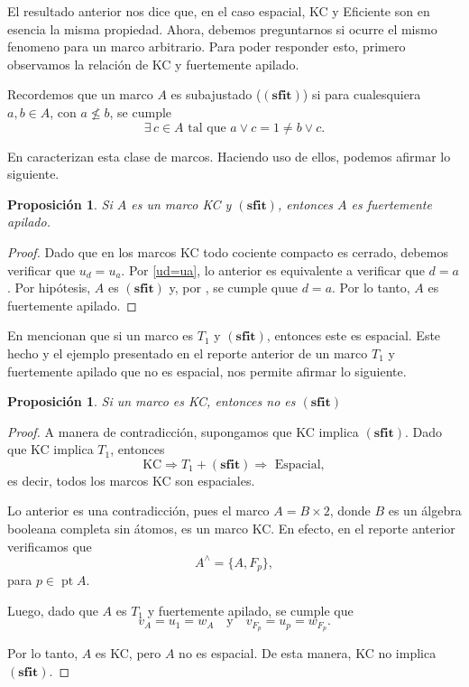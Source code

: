 \documentclass[12pt]{article}
\newtheorem{prop}[thm]{Proposición}
\DeclareMathOperator{\pt}{pt}
\begin{document}
El resultado anterior nos dice que, en el caso espacial, KC y Eficiente son en esencia la misma propiedad. Ahora, debemos
preguntarnos si ocurre el mismo fenomeno para un marco arbitrario. Para poder responder esto, primero observamos la relación
de KC y fuertemente apilado.

Recordemos que un marco $A$ es subajustado ($(\mathbf{sfit})$) si para cualesquiera $a,b\in A$, con $a\nleq b$, se cumple 
\[
\exists\, c\in A\text{ tal que }a\vee c=1\neq b\vee c.
\]

En \cite{simmons2006regularity,picado2021separation} caracterizan esta clase de marcos. Haciendo uso de ellos, 
podemos afirmar lo siguiente.

\begin{prop}\label{KCsfit}
    Si $A$ es un marco KC y $\mathbf{(sfit)}$, entonces $A$ es fuertemente apilado.
\end{prop}

\begin{proof}
    Dado que en los marcos KC todo cociente compacto es cerrado, debemos verificar que $u_d=u_a$. Por \eqref{ud=ua}, lo anterior 
    es equivalente a verificar que $d=a$. Por hipótesis, $A$ es $\mathbf{(sfit)}$ y, por \cite[Teorema 3.5]{simmons2006regularity}, 
    se cumple quue $d=a$. Por lo tanto, $A$ es fuertemente apilado.
\end{proof}

En \cite[Proposición 2.5.3]{picado2021separation} mencionan que si un marco es $T_1$ y $\mathbf{(sfit)}$, entonces este es espacial. Este hecho
y el ejemplo presentado en el reporte anterior de un marco $T_1$ y fuertemente apilado que no es espacial, nos permite afirmar lo siguiente.

\begin{prop}
    Si un marco es KC, entonces no es $\mathbf{(sfit)}$
\end{prop}

\begin{proof}
    A manera de contradicción, supongamos que KC implica $\mathbf{(sfit)}$. Dado que KC implica $T_1$, entonces
    \[
    \text{KC}\Rightarrow T_1+ \mathbf{(sfit)}\Rightarrow \text{ Espacial},
    \]
    es decir, todos los marcos KC son espaciales.
    
    Lo anterior es una contradicción, pues el marco $A=B\times 2$, donde $B$ es un álgebra booleana completa sin átomos, es un marco 
    KC. En efecto, en el reporte anterior verificamos que
    \[
    A^\wedge=\{A, F_p\},
    \]
    para $p\in \pt A$. 

    Luego, dado que $A$ es $T_1$ y fuertemente apilado, se cumple que
    \[
    v_A=u_1=w_A\quad\text{y}\quad v_{F_p}=u_p=w_{F_p}.
    \]

    Por lo tanto, $A$ es KC, pero $A$ no es espacial. De esta manera, KC no implica $\mathbf{(sfit)}$.

\end{proof}
\end{document}
